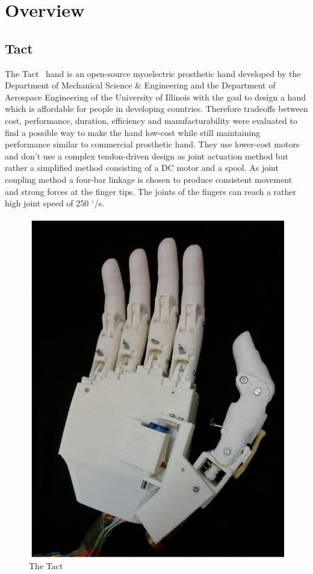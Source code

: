 \documentclass[a4paper, 10pt, conference]{ieeeconf}      %
\begin{document}
\section{Overview}

\subsection{Tact}

The Tact~\cite{tact} hand is an open-source myoelectric prosthetic hand developed by the Department of Mechanical Science \& Engineering and the Department of Aerospace Engineering of the University of Illinois with the goal to design a hand which is affordable for people in developing countries. Therefore tradeoffs between cost, performance, duration, efficiency and manufacturability were evaluated to find a possible way to make the hand low-cost while still maintaining performance similar to commercial prosthetic hand. They use lower-cost motors and don't use a complex tendon-driven design as joint actuation method but rather a simplified method consisting of a DC motor and a spool. As joint coupling method a four-bar linkage is chosen to produce consistent movement and strong forces at the finger tips. The joints of the fingers can reach a rather high joint speed of 250 $^\circ$/s.

\begin{figure}[h]

	\centering
	\includegraphics[scale=0.25]{images/Tact}
	
	\caption{The Tact}
\end{figure}
\end{document}
